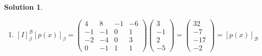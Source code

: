 \documentclass[10pt]{article}
\theoremstyle{definition}
\newtheorem{soln}{Solution}
\begin{document}
\begin{soln}
\begin{enumerate}[label=(\alph*)]
\begin{align*}
\begin{matrix}
                      (2)\cdot(-1)+(2)\cdot(0)+(3)\cdot(0)+(2)\cdot(1)   & (2)\cdot(-6)+(2)\cdot(1)+(3)\cdot(3)+(2)\cdot(1)
                    \end{matrix}\right)         \\
             & \stackrel{{\normalfont\tiny\mbox{drumroll}}}{=}
            \begin{pmatrix}
              1 & 0 & 0 & 0 \\
              0 & 1 & 0 & 0 \\
              0 & 0 & 1 & 0 \\
              0 & 0 & 0 & 1
            \end{pmatrix}
          \end{align*}
    \item $\left[I\right]_\beta^\mathcal{B}\left[p(x)\right]_\beta=\begin{pmatrix}
              4  & 8  & -1 & -6 \\
              -1 & -1 & 0  & 1  \\
              -2 & -4 & 0  & 3  \\
              0  & -1 & 1  & 1
            \end{pmatrix}  \begin{pmatrix}
              3  \\
              -1 \\
              2  \\
              -5
            \end{pmatrix}=
            \begin{pmatrix}
              32  \\
              -7  \\
              -17 \\
              -2
            \end{pmatrix}=\left[p(x)\right]_\mathcal{B}$
  \end{enumerate}
\end{soln}
\end{document}
